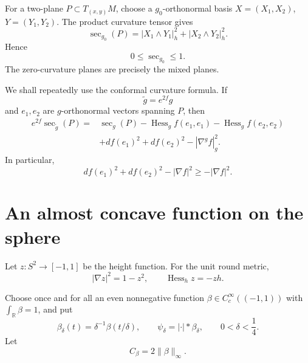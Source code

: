 \documentclass[11pt]{amsart}
\theoremstyle{definition}
\newcommand{\Hess}{\operatorname{Hess}}
\begin{document}
For a two-plane $P\subset T_{(x,y)}M$, choose a $g_0$-orthonormal basis
$X=(X_1,X_2)$, $Y=(Y_1,Y_2)$.  The product curvature tensor gives
\begin{equation}\label{eq:product-curvature}
 \sec_{g_0}(P)
 =|X_1\wedge Y_1|_h^2+|X_2\wedge Y_2|_h^2.
\end{equation}
Hence
\begin{equation}\label{eq:product-bounds}
 0\le\sec_{g_0}\le1.
\end{equation}
The zero-curvature planes are precisely the mixed planes.

We shall repeatedly use the conformal curvature formula.  If
\[
 \widetilde g=e^{2f}g
\]
and $e_1,e_2$ are $g$-orthonormal vectors spanning $P$, then
\begin{equation}\label{eq:conformal-curvature}
\begin{split}
 e^{2f}\sec_{\widetilde g}(P)
 ={}&\sec_g(P)-\Hess_g f(e_1,e_1)-\Hess_g f(e_2,e_2)\\
 &+df(e_1)^2+df(e_2)^2-|\nabla^g f|_g^2.
\end{split}
\end{equation}
In particular,
\begin{equation}\label{eq:gradient-worst}
 df(e_1)^2+df(e_2)^2-|\nabla f|^2\ge-|\nabla f|^2.
\end{equation}

\section{An almost concave function on the sphere}

Let $z:S^2\to[-1,1]$ be the height function.  For the unit round metric,
\begin{equation}\label{eq:height}
 |\nabla z|^2=1-z^2,
 \qquad
 \Hess_h z=-z h.
\end{equation}

Choose once and for all an even nonnegative function
$\beta\in C_c^\infty((-1,1))$ with $\int_{\mathbb R}\beta=1$, and put
\[
 \beta_\delta(t)=\delta^{-1}\beta(t/\delta),
 \qquad
 \psi_\delta=|\cdot|*\beta_\delta,
 \qquad 0<\delta<\frac14.
\]
Let
\[
 C_\beta=2\|\beta\|_\infty.
\]
\end{document}
